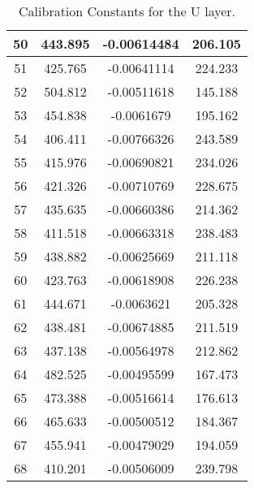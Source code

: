 \begin{table}[h]
{\begin{tabular}{|c|c|c|c|}
50   &   443.895   &   -0.00614484   &   206.105  \\  \hline  
51   &   425.765   &   -0.00641114   &   224.233  \\  \hline  
52   &   504.812   &   -0.00511618   &   145.188  \\  \hline  
53   &   454.838   &   -0.0061679   &   195.162  \\  \hline  
54   &   406.411   &   -0.00766326   &   243.589  \\  \hline  
55   &   415.976   &   -0.00690821   &   234.026  \\  \hline  
56   &   421.326   &   -0.00710769   &   228.675  \\  \hline  
57   &   435.635   &   -0.00660386   &   214.362  \\  \hline  
58   &   411.518   &   -0.00663318   &   238.483  \\  \hline  
59   &   438.882   &   -0.00625669   &   211.118  \\  \hline  
60   &   423.763   &   -0.00618908   &   226.238  \\  \hline  
61   &   444.671   &   -0.0063621   &   205.328  \\  \hline  
62   &   438.481   &   -0.00674885   &   211.519  \\  \hline  
63   &   437.138   &   -0.00564978   &   212.862  \\  \hline  
64   &   482.525   &   -0.00495599   &   167.473  \\  \hline  
65   &   473.388   &   -0.00516614   &   176.613  \\  \hline  
66   &   465.633   &   -0.00500512   &   184.367  \\  \hline  
67   &   455.941   &   -0.00479029   &   194.059  \\  \hline  
68   &   410.201   &   -0.00506009   &   239.798  \\  \hline  
        \end{tabular}
        }
        \caption{Calibration Constants for the U layer.}
        \label{tab:UattenC}
\end{table}


